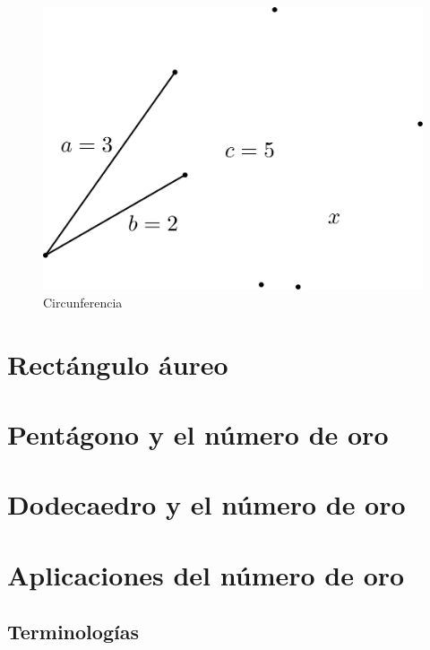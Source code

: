 \documentclass[
  11pt,
]{krantz}
\theoremstyle{definition}
\theoremstyle{definition}
\theoremstyle{definition}
\theoremstyle{definition}
\theoremstyle{remark}
\begin{document}
\begin{figure}

{\centering \includegraphics{proporcion} 

}

\caption{Circunferencia}\label{fig:C2}
\end{figure}

\hypertarget{rectuxe1ngulo-uxe1ureo}{%
\section{Rectángulo áureo}\label{rectuxe1ngulo-uxe1ureo}}

\hypertarget{pentuxe1gono-y-el-nuxfamero-de-oro}{%
\section{Pentágono y el número de oro}\label{pentuxe1gono-y-el-nuxfamero-de-oro}}

\hypertarget{dodecaedro-y-el-nuxfamero-de-oro}{%
\section{Dodecaedro y el número de oro}\label{dodecaedro-y-el-nuxfamero-de-oro}}

\hypertarget{aplicaciones-del-nuxfamero-de-oro}{%
\section{Aplicaciones del número de oro}\label{aplicaciones-del-nuxfamero-de-oro}}

\hypertarget{terminologuxedas}{%
\subsection{Terminologías}\label{terminologuxedas}}
\end{document}
